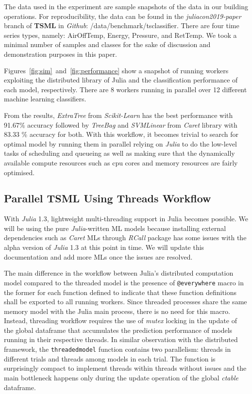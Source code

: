 \documentclass{juliacon}
\begin{document}
The data used in the experiment are sample snapshots of the data in our building operations. For reproducibility, the data can be found in the  \emph{juliacon2019-paper} branch of \textbf{TSML} in \emph{Github}:  /data/benchmark/tsclassifier. There are four time series types, namely: AirOffTemp, Energy, Pressure, and RetTemp.  We  took a minimal number of samples and classes for the sake of discussion and demonstration purposes in this paper.

\vskip 6pt

Figures~\ref{fig:sim}~and~\ref{fig:performance}  show a snapshot of running workers exploiting the distributed library of Julia and the classification performance of each model, respectively. There are 8 workers running in parallel over 12 different machine learning classifiers. 

\vskip 6pt

From the results, \emph{ExtraTree} from \emph{Scikit-Learn} has the best performance with 91.67\% accuracy followed by \emph{TreeBag} and \emph{SVMLinear} from \emph{Caret} library with 83.33 \% accuracy for both. With this workflow, it becomes trivial to search for optimal model by running them in parallel relying on \emph{Julia} to do the low-level tasks of scheduling and queueing as well as making sure that  the dynamically available compute resources such as cpu cores and memory resources are fairly optimised.           

\subsection{Parallel TSML Using Threads Workflow}
With \emph{Julia} 1.3, lightweight multi-threading support in Julia becomes possible. We will be using the pure \emph{Julia}-written ML models because installing external dependencies such as \emph{Caret} MLs through \emph{RCall} package has some issues with the alpha version of \emph{Julia} 1.3 at this point in time. We will update this documentation and add more MLs once the issues are resolved.

\vskip 6pt

The main difference in the workflow between Julia's distributed computation model compared to the threaded model is the presence of \texttt{@everywhere} macro in the former for each function defined to indicate that these function definitions shall be exported to all running workers. Since threaded processes share the same memory model with the Julia main process, there is no need for this macro. Instead, threading workflow requires the use of \emph{mutex} locking in the update of the global dataframe that accumulates the prediction performance of models running in their respective threads. In similar observation with the distributed framework, the \texttt{threadedmodel} function contains two parallelism: threads in different trials and threads among models in each trial. The function is surprisingly compact to implement threads within threads without issues and the main bottleneck happens only during the update operation of the global \emph{ctable} dataframe.
\end{document}
